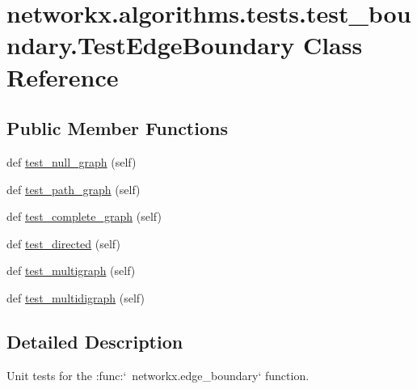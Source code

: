 \hypertarget{classnetworkx_1_1algorithms_1_1tests_1_1test__boundary_1_1TestEdgeBoundary}{}\section{networkx.\+algorithms.\+tests.\+test\+\_\+boundary.\+Test\+Edge\+Boundary Class Reference}
\label{classnetworkx_1_1algorithms_1_1tests_1_1test__boundary_1_1TestEdgeBoundary}
\subsection*{Public Member Functions}
\begin{DoxyCompactItemize}
\item 
def \hyperlink{classnetworkx_1_1algorithms_1_1tests_1_1test__boundary_1_1TestEdgeBoundary_a083be2d1428a4448ca5ca28af3847cde}{test\+\_\+null\+\_\+graph} (self)
\item 
def \hyperlink{classnetworkx_1_1algorithms_1_1tests_1_1test__boundary_1_1TestEdgeBoundary_aa150573c52036598acd71d08b348fe85}{test\+\_\+path\+\_\+graph} (self)
\item 
def \hyperlink{classnetworkx_1_1algorithms_1_1tests_1_1test__boundary_1_1TestEdgeBoundary_a45727e237d723c0c49ddab293f757ada}{test\+\_\+complete\+\_\+graph} (self)
\item 
def \hyperlink{classnetworkx_1_1algorithms_1_1tests_1_1test__boundary_1_1TestEdgeBoundary_ae07b8f4dd5badb82e2ecd027ad75f533}{test\+\_\+directed} (self)
\item 
def \hyperlink{classnetworkx_1_1algorithms_1_1tests_1_1test__boundary_1_1TestEdgeBoundary_a71e570d0f4544d0d86ba9fa51bc0f397}{test\+\_\+multigraph} (self)
\item 
def \hyperlink{classnetworkx_1_1algorithms_1_1tests_1_1test__boundary_1_1TestEdgeBoundary_aa353a30c4193b74048421b9f17f448e5}{test\+\_\+multidigraph} (self)
\end{DoxyCompactItemize}


\subsection{Detailed Description}
\begin{DoxyVerb}Unit tests for the :func:`~networkx.edge_boundary` function.\end{DoxyVerb}
 

